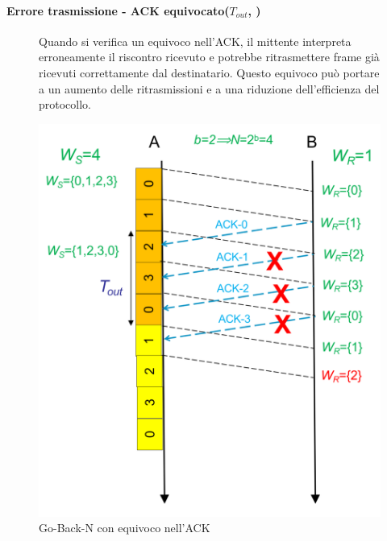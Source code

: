 \paragraph{Errore trasmissione - ACK equivocato($T_{out}$, )}
\begin{figure}[htbp]
    \centering
    \begin{minipage}{0.55\textwidth}
        Quando si verifica un equivoco nell'ACK, il mittente interpreta erroneamente il riscontro ricevuto e potrebbe ritrasmettere frame già ricevuti correttamente dal destinatario. 
        Questo equivoco può portare a un aumento delle ritrasmissioni e a una riduzione dell'efficienza del protocollo.
    \end{minipage}%
    \hfill
    \begin{minipage}{0.4\textwidth}
        \includegraphics[width=\linewidth]{images/equivocoack.png}
        \caption{Go-Back-N con equivoco nell'ACK}
    \end{minipage}
\end{figure}

